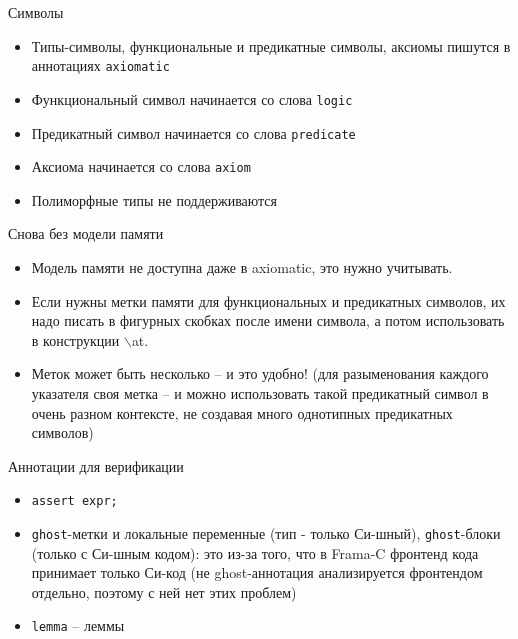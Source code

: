 \documentclass[hyperref={unicode=true}]{beamer}
\begin{document}
    \begin{frame}{Символы}
    \begin{itemize}
    \item
    Типы-символы, функциональные и предикатные символы, аксиомы
    пишутся в аннотациях \texttt{axiomatic}
    \item
    Функциональный символ начинается со слова \texttt{logic}
    \item
    Предикатный символ начинается со слова \texttt{predicate}
    \item
    Аксиома начинается со слова \texttt{axiom}
    \item
    Полиморфные типы не поддерживаются
    \end{itemize}
    \end{frame}

    \begin{frame}{Снова без модели памяти}
    \begin{itemize}
    \item
    Модель памяти не доступна даже в axiomatic, это нужно учитывать.
    \item
    Если нужны метки памяти для функциональных и предикатных символов,
    их надо писать в фигурных скобках после имени символа, а потом
    использовать в конструкции \texttt{$\backslash$}at.
    \item
    Меток может быть несколько -- и это удобно! (для разыменования
            каждого указателя своя метка -- и можно использовать
            такой предикатный символ в очень разном контексте,
            не создавая много однотипных предикатных символов)
    \end{itemize}
    \end{frame}

    \begin{frame}{Аннотации для верификации}
    \begin{itemize}
    \item
    \texttt{assert expr;}
    \item
    \texttt{ghost}-метки и локальные переменные (тип - только Си-шный),
    \texttt{ghost}-блоки (только с Си-шным кодом): это из-за того, что
    в Frama-C фронтенд кода принимает только Си-код (не ghost-аннотация
    анализируется фронтендом отдельно, поэтому с ней нет этих проблем)
    \item
    \texttt{lemma} -- леммы
    \end{itemize}
    \end{frame}
\end{document}
